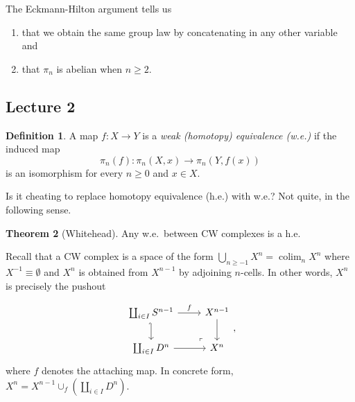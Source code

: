 \documentclass[10pt,letterpaper,cm]{nupset}
\theoremstyle{definition}
\newtheorem{defn}{Definition}[subsection]
\theoremstyle{theorem}
\newtheorem{theorem}[defn]{Theorem}
\theoremstyle{remark}
\newcommand{\1}{\mathbb{1}}
\newcommand{\0}{\vec 0}
\DeclareMathOperator{\colim}{colim}
\newcommand{\be}{\begin{enumerate}}
\newcommand{\ee}{\end{enumerate}}
\begin{document}
The Eckmann-Hilton argument tells us
\be
\item that we obtain the same group law by concatenating in any other variable and
\item that $\pi_n$ is abelian when $n\geq 2$.
\ee


\subsection{Lecture 2}

\begin{defn}
A map $f: X \to Y$ is a \textit{weak \emph{(}homotopy\emph{)} equivalence \emph{(}w.e.\emph{)}} if  the induced map
\[
\pi_n(f) : \pi_n(X,x) \to \pi_n(Y,f(x))
\] is an isomorphism for every $n \geq 0$ and $x\in X$.
\end{defn}

Is it cheating to replace homotopy equivalence (h.e.) with w.e.? Not quite, in the following sense.

\begin{theorem}[Whitehead]\label{Whitehead}
Any w.e.\ between CW complexes is a h.e.
\end{theorem}

Recall that a CW complex is a space of the form $\bigcup_{n\geq {-1}}X^n = \colim_n{X^n}$ where $X^{-1} \equiv \emptyset$ and $X^n$ is obtained from $X^{n-1}$ by adjoining $n$-cells. In other words, $X^n$ is precisely the pushout

\[
\begin{tikzcd}
	{\coprod_{i\in I}S^{n-1}} & {X^{n-1}} \\
	{\coprod_{i\in I}D^n} & {X^n}
	\arrow["\lrcorner"{anchor=center, pos=0.125, rotate=180}, draw=none, from=2-2, to=1-1]
	\arrow[hook', from=1-1, to=2-1]
	\arrow["f", from=1-1, to=1-2]
	\arrow[from=1-2, to=2-2]
	\arrow[from=2-1, to=2-2]
\end{tikzcd},
\] where $f$ denotes the attaching map. In concrete form, $X^n = X^{n-1} \cup_f \left(\coprod_{i\in I}D^n\right)$.
\end{document}
